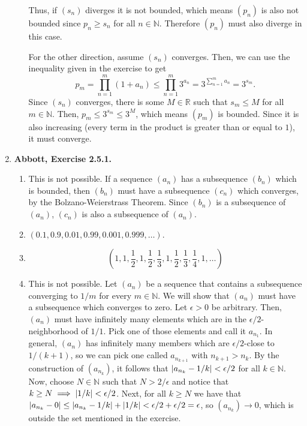 \documentclass{article}
\DeclarePairedDelimiter\abs{\lvert}{\rvert}
\newcommand{\N}{\mathbb{N}}
\newcommand{\R}{\mathbb{R}}
\newcommand{\ra}{\rightarrow}
\newcommand{\exc}[2][Abbott]{\item \textbf{#1, Exercise #2.}}
\newcommand{\lep}[1][L]{#1et $\epsilon > 0$ be arbitrary}
\begin{document}
\begin{enumerate}
\begin{enumerate}
        Thus, if $(s_n)$ diverges it is not bounded, which means $(p_n)$ is also not bounded since $p_n \geq s_n$ for all $n \in \N$. Therefore $(p_n)$ must also diverge in this case.
        
        For the other direction, assume $(s_n)$ converges. Then, we can use the inequality given in the exercise to get 
        \begin{equation*}
            p_m = \prod_{n=1}^m (1+a_n) \leq \prod_{n=1}^m 3^{a_n} 
            = 3^{\sum\limits_{n=1}^m a_n} = 3^{s_m}.
        \end{equation*} Since $(s_n)$ converges, there is some $M \in \R$ such that $s_m \leq M$ for all $m \in \N$. Then, $p_m \leq 3^{s_m}\leq 3^M$, which means $(p_m)$ is bounded. Since it is also increasing (every term in the product is greater than or equal to $1$), it must converge.
    \end{enumerate}
    
    \exc{2.5.1}
    \begin{enumerate}
        \item This is not possible. If a sequence $(a_n)$ has a subsequence $(b_n)$ which is bounded, then $(b_n)$ must have a subsequence $(c_n)$ which converges, by the Bolzano-Weierstrass Theorem. Since $(b_n)$ is a subsequence of $(a_n)$, $(c_n)$ is also a subsequence of $(a_n)$.
        
        \item $(0.1,0.9,0.01,0.99,0.001,0.999, \dots)$.
        
        \item \begin{equation*}
            (1, 1, \frac{1}{2}, 1, \frac{1}{2}, \frac{1}{3}, 1, \frac{1}{2}, \frac{1}{3}, \frac{1}{4}, 1, \dots)
        \end{equation*}
        
        \item This is not possible. Let $(a_n)$ be a sequence that contains a subsequence converging to $1/m$ for every $m \in \N$. We will show that $(a_n)$ must have a subsequence which converges to zero. \lep. Then, $(a_n)$ must have infinitely many elements which are in the $\epsilon/2$-neighborhood of $1/1$. Pick one of those elements and call it $a_{n_1}$. In general, $(a_n)$ has infinitely many members which are $\epsilon/2$-close to $1/(k+1)$, so we can pick one called $a_{n_{k+1}}$ with $n_{k+1} > n_k$. By the construction of $(a_{n_k})$, it follows that $\abs{a_{n_k} - 1/k} < \epsilon/2$ for all $k \in \N$. Now, choose $N \in \N$ such that $N > 2/\epsilon$ and notice that $k \geq N \implies \abs{1/k} < \epsilon/2$. Next, for all $k \geq N$ we have that $\abs{a_{n_k}-0} \leq \abs{a_{n_k}-1/k}+\abs{1/k} < \epsilon/2 + \epsilon/2 = \epsilon$, so $(a_{n_k}) \ra 0$, which is outside the set mentioned in the exercise.
    \end{enumerate}
    

\end{enumerate}
\end{document}
